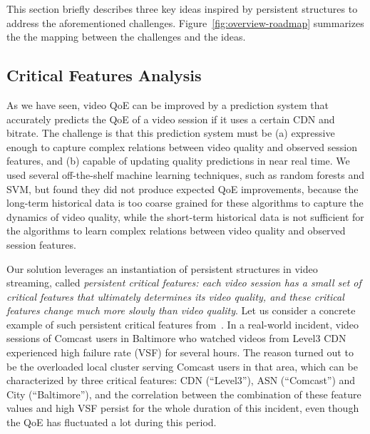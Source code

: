 This section briefly describes three key ideas inspired by 
persistent structures
to address the aforementioned challenges. 
Figure~\ref{fig:overview-roadmap} summarizes the 
the mapping between the challenges and the ideas.


\subsection{Critical Features Analysis}
\label{subsec:overview:cfa}

As we have seen, video QoE can be improved by
a prediction system that accurately predicts the QoE 
of a video session if it uses a certain CDN and bitrate.
The challenge is that this prediction system must be 
(a) expressive enough to capture complex relations 
between video quality and observed session features, 
and (b) capable of updating quality predictions in near 
real time.
We used several off-the-shelf machine learning 
techniques, such as random forests and SVM, but 
found they did not produce expected QoE improvements, 
because the long-term historical data is too coarse grained 
for these algorithms to capture the dynamics of video 
quality, while the short-term historical data is not sufficient 
for the algorithms to learn complex relations between 
video quality and observed session features.

Our solution leverages an instantiation of persistent structures
in video streaming, called 
{\em persistent critical features: each video session has 
a small set of critical features that ultimately determines 
its video quality, and these critical features change much 
more slowly than video quality}. 
Let us consider a concrete example of such persistent 
critical features from~\cite{cfa}.
In a real-world incident, video sessions of Comcast
users in Baltimore who watched videos from Level3
CDN experienced high failure rate (VSF) for several
hours. The reason turned out
to be the overloaded local cluster serving Comcast
users in that area,
which can be characterized by three critical features: 
CDN (``Level3''), ASN (``Comcast'') and City (``Baltimore''),
and the correlation between the combination of these
feature values and high VSF persist for the whole
duration of this incident, even though the QoE
has fluctuated a lot during this period.

